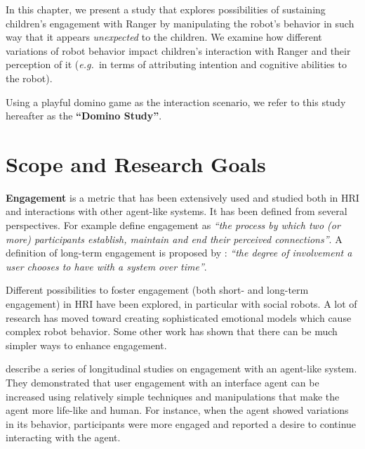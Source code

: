 \documentclass{sig-alternate}
\newcommand{\eg}{{\textit{e.g.~}}}
\begin{document}
In this chapter, we present a study that explores possibilities of sustaining
children's engagement with Ranger by manipulating the robot's behavior in such
way that it appears \textit{unexpected} to the children. We examine how
different variations of robot behavior impact children's interaction with Ranger
and their perception of it (\eg in terms of attributing intention and cognitive
abilities to the robot).

Using a playful domino game as the interaction scenario, we refer to this study
hereafter as the \textbf{``Domino Study''}.

\section{Scope and Research Goals}

\textbf{Engagement} is a metric that has been extensively used and studied both
in HRI and interactions with other agent-like systems. It has been defined from
several perspectives. For example \cite{sidner_where_2004} define engagement as
\textit{``the process by which two (or more) participants establish, maintain
and end their perceived connections''}. A definition of long-term engagement is
proposed by \cite{bickmore_maintaining_2010}: \textit{``the degree of
involvement a user chooses to have with a system over time''}.

Different possibilities to foster engagement (both short- and long-term
engagement) in HRI have been explored, in particular with social robots. A lot
of research has moved toward creating sophisticated emotional models which cause
complex robot behavior. Some other work
\cite{bickmore_maintaining_2010,short_no_2010} has shown that there can be much
simpler ways to enhance engagement. 

\cite{bickmore_maintaining_2010} describe a series of longitudinal studies on
engagement with an agent-like system. They demonstrated that user engagement
with an interface agent can be increased using relatively simple techniques and
manipulations that make the agent more life-like and human. For instance, when
the agent showed variations in its behavior, participants were more engaged and
reported a desire to continue interacting with the agent.
\end{document}
